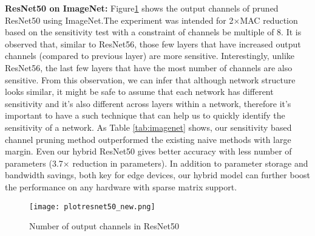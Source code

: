 \documentclass{article}
\begin{document}
\textbf{ResNet50 on ImageNet:}
Figure\ref{fig:channelprune50} shows the output channels of pruned ResNet50 using ImageNet.The experiment was intended for 2$\times$MAC reduction based on the sensitivity test with a constraint of channels be multiple of 8. %
It is observed that, similar to ResNet56, those few layers that have increased output channels (compared to previous layer) are more sensitive. Interestingly, unlike ResNet56, the last few layers that have the most number of channels are also sensitive. From this observation, we can infer that although network structure looks similar, it might be safe to assume that each network has different sensitivity and it's also different across layers within a network, therefore it's important to have a such technique that can help us to quickly identify the sensitivity of a network. As Table \ref{tab:imagenet} shows, our sensitivity based channel pruning method outperformed the existing naive methods with large margin. Even our hybrid ResNet50 gives better accuracy with less number of parameters (3.7$\times$ reduction in parameters). In addition to parameter storage and bandwidth savings, both key for edge devices, our hybrid model can further boost the performance on any hardware with sparse matrix support.

\begin{figure}[!htbp]
\vspace{-6mm}
\begin{center}
\texttt{[image: plotresnet50\_new.png]}
\end{center}
\vspace{-3.5mm}
\caption{Number of output channels in ResNet50}
\vspace{-2mm}
\label{fig:channelprune50}
\end{figure}

\end{document}
